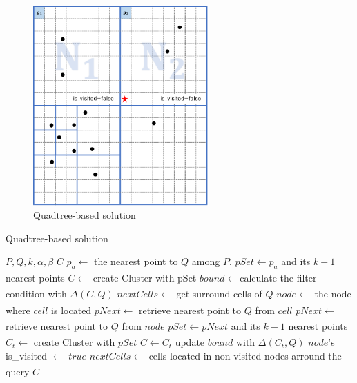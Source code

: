 \documentclass[a4paper,11pt]{report}
\theoremstyle{mytheoremstyle}
\begin{document}
\begin{figure}
    \begin{center}
        \includegraphics[width=0.6\textwidth]{images/solution-QuadTree2.pdf}
        \caption{Quadtree-based solution} \label{fig:solution-quadTree2}
    \end{center}
\end{figure}

\begin{algorithm}                      
\caption{Quadtree-based solution}         
\label{alg:quadtree}
\begin{algorithmic}[1]                  
\renewcommand{\algorithmicrequire}{\textbf{Input:}}
\renewcommand{\algorithmicensure}{\textbf{Output:}}
\REQUIRE $P,Q,k,\alpha, \beta$
\ENSURE $C$
\STATE $p_a \xleftarrow[]{}$ the nearest point to $Q$ among $P$.
\STATE $pSet \xleftarrow{} p_a$ and its $k-1$ nearest points
\STATE $C \xleftarrow[]{}$ create Cluster with pSet
\STATE $bound \xleftarrow[]{} $calculate the filter condition with $\Delta(C,Q)$
\STATE $nextCells \xleftarrow[]{} $ get surround cells of $Q$
\STATE $node \xleftarrow[]{}$ the node where $cell$ is located
\STATE $pNext \xleftarrow[]{}$ retrieve nearest point to $Q$ from $cell$
\ELSE
\STATE $pNext \xleftarrow[]{}$ retrieve nearest point to $Q$ from $node$
\ENDIF
\STATE $pSet \xleftarrow[]{} pNext$ and its $k-1$ nearest points
\STATE $C_t \xleftarrow{}$ create Cluster with $pSet$
\STATE $C \xleftarrow{} C_t$
\STATE update $bound$ with $\Delta(C_t,Q)$
\ENDIF
\STATE $node$'s is\_visited $\xleftarrow[]{}$ $true$
\ENDFOR
\STATE $nextCells \xleftarrow[]{} $ cells located in non-visited nodes arround the query
\ENDWHILE
\RETURN $C$
\end{algorithmic}
\end{algorithm}
\end{document}
